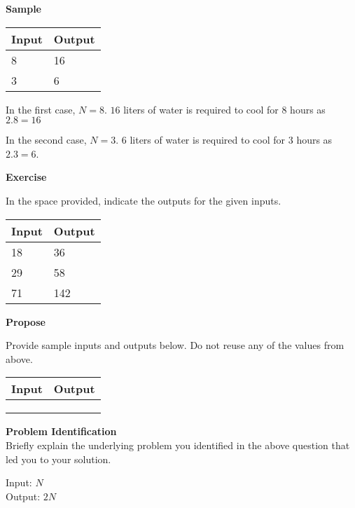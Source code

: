 \documentclass[a4paper]{exam}
\newcommand\heading[1]{\textbf{#1}}
\begin{document}
\begin{questions}
    \heading{Sample}

    \begin{tabularx}{\textwidth}{|X|X|}
        \rowcolor{gray!50}
        \hline
        Input & Output \\ \hline\hline
        8     & 16     \\\hline
        3     & 6      \\\hline
    \end{tabularx}

    In the first case, $N=8$. $16$ liters of water is required to cool for $8$ hours as $2.8=16$

    In the second case, $N=3$. $6$ liters of water is required to cool for $3$ hours as $2.3=6$.

    \heading{Exercise}

    In the space provided, indicate the outputs for the given inputs.

    \begin{tabularx}{\textwidth}{|X|X|}
        \rowcolor{gray!50}
        \hline
        Input & Output \\ \hline\hline
        18    & 36     \\\hline
        29    & 58     \\\hline
        71    & 142    \\\hline
    \end{tabularx}

    \heading{Propose}

    Provide sample inputs and outputs below. Do not reuse any of the values from above.

    \begin{tabularx}{\textwidth}{|X|X|}
        \rowcolor{gray!50}
        \hline
        Input & Output \\ \hline\hline
              &        \\\hline
              &        \\\hline
              &        \\\hline
    \end{tabularx}


    \heading{Problem Identification}\\
    Briefly explain the underlying problem you identified in the above question that led you to your solution.

    \begin{mdframed}
      Input: $N$\\
      Output: $2N$
    \end{mdframed}



\end{questions}
\end{document}
